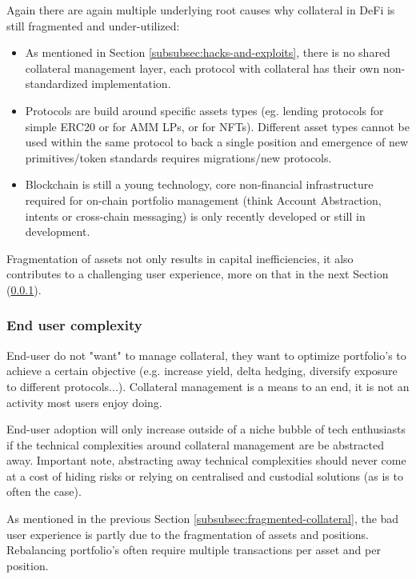 \documentclass[sigconf,nonacm]{acmart}
\begin{document}
Again there are again multiple underlying root causes why collateral in DeFi is still fragmented and under-utilized:
\begin{itemize}
    \item As mentioned in Section \ref{subsubsec:hacks-and-exploits}, there is no shared collateral management layer, each protocol with collateral has their own non-standardized implementation.
    \item Protocols are build around specific assets types (eg. lending protocols for simple ERC20 or for AMM LPs, or for NFTs). 
    Different asset types cannot be used within the same protocol to back a single position and emergence of new primitives/token standards requires migrations/new protocols.
    \item Blockchain is still a young technology, core non-financial infrastructure required for on-chain portfolio management (think Account Abstraction, intents or cross-chain messaging) is only recently developed or still in development. 
\end{itemize}

Fragmentation of assets not only results in capital inefficiencies, it also contributes to a challenging user experience, more on that in the next Section (\ref{subsubsec:end-user-complexity}).

\subsubsection{End user complexity}
\label{subsubsec:end-user-complexity}

End-user do not "want" to manage collateral, they want to optimize portfolio's to achieve a certain objective (e.g. increase yield, delta hedging, diversify exposure to different protocols...).
Collateral management is a means to an end, it is not an activity most users enjoy doing.

End-user adoption will only increase outside of a niche bubble of tech enthusiasts if the technical complexities around collateral management are be abstracted away.
Important note, abstracting away technical complexities should never come at a cost of hiding risks or relying on centralised and custodial solutions (as is to often the case).

As mentioned in the previous Section \ref{subsubsec:fragmented-collateral}, the bad user experience is partly due to the fragmentation of assets and positions.
Rebalancing portfolio's often require multiple transactions per asset and per position.
\end{document}
